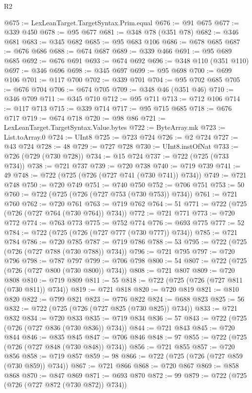 \begin{lexlean}{R2}
\begin{coremodule}
@675 := LexLeanTarget.TargetSyntax.Prim.equal
@676 := @91 @675
@677 := @339 @450
@678 := @95 @677
@681 := @348 @78 (@351 @78)
@682 := @346 @681
@683 := @345 @682
@685 := @95 @683 @106
@686 := @678 @685
@687 := @676 @686
@688 := @674 @687
@689 := @339 @466
@691 := @95 @689 @685
@692 := @676 @691
@693 := @674 @692
@696 := @348 @110 (@351 @110)
@697 := @346 @696
@698 := @345 @697
@699 := @95 @698
@700 := @699 @106
@701 := @117 @700
@702 := @339 @701
@704 := @95 @702 @685
@705 := @676 @704
@706 := @674 @705
@709 := @348 @46 (@351 @46)
@710 := @346 @709
@711 := @345 @710
@712 := @95 @711
@713 := @712 @106
@714 := @117 @713
@715 := @339 @714
@717 := @95 @715 @685
@718 := @676 @717
@719 := @674 @718
@720 := @98 @86
@721 := LexLeanTarget.TargetSyntax.Value.bytes
@722 := ByteArray.mk
@723 := List.toArray.{0}
@724 := UInt8
@725 := @723 @724
@726 := @2 @724
@727 := @43 @724
@728 := 48
@729 := @727 @728
@730 := UInt8.instOfNat
@733 := @726 (@729 (@730 @728))
@734 := @15 @724
@737 := @722 (@725 (@733 @734))
@738 := @721 @737
@739 := @720 @738
@740 := @719 @739
@741 := 49
@748 := @722 (@725 (@726 (@727 @741 (@730 @741)) @734))
@749 := @721 @748
@750 := @720 @749
@751 := @740 @750
@752 := @706 @751
@753 := 50
@760 := @722 (@725 (@726 (@727 @753 (@730 @753)) @734))
@761 := @721 @760
@762 := @720 @761
@763 := @719 @762
@764 := 51
@771 := @722 (@725 (@726 (@727 @764 (@730 @764)) @734))
@772 := @721 @771
@773 := @720 @772
@774 := @763 @773
@775 := @752 @774
@776 := @693 @775
@777 := 52
@784 := @722 (@725 (@726 (@727 @777 (@730 @777)) @734))
@785 := @721 @784
@786 := @720 @785
@787 := @719 @786
@788 := 53
@795 := @722 (@725 (@726 (@727 @788 (@730 @788)) @734))
@796 := @721 @795
@797 := @720 @796
@798 := @787 @797
@799 := @706 @798
@800 := 54
@807 := @722 (@725 (@726 (@727 @800 (@730 @800)) @734))
@808 := @721 @807
@809 := @720 @808
@810 := @719 @809
@811 := 55
@818 := @722 (@725 (@726 (@727 @811 (@730 @811)) @734))
@819 := @721 @818
@820 := @720 @819
@821 := @810 @820
@822 := @799 @821
@823 := @776 @822
@824 := @688 @823
@825 := 56
@832 := @722 (@725 (@726 (@727 @825 (@730 @825)) @734))
@833 := @721 @832
@834 := @720 @833
@835 := @719 @834
@836 := 57
@843 := @722 (@725 (@726 (@727 @836 (@730 @836)) @734))
@844 := @721 @843
@845 := @720 @844
@846 := @835 @845
@847 := @706 @846
@848 := 97
@855 := @722 (@725 (@726 (@727 @848 (@730 @848)) @734))
@856 := @721 @855
@857 := @720 @856
@858 := @719 @857
@859 := 98
@866 := @722 (@725 (@726 (@727 @859 (@730 @859)) @734))
@867 := @721 @866
@868 := @720 @867
@869 := @858 @868
@870 := @847 @869
@871 := @693 @870
@872 := 99
@879 := @722 (@725 (@726 (@727 @872 (@730 @872)) @734))

\end{coremodule}
\end{lexlean}
